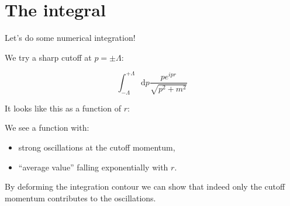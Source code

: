 \documentclass[aspectratio=169]{beamer}
\newcommand{\integrand}{\frac{p e^{ipr}}{\sqrt{p^2 + m^2}}}
\newcommand{\diffop}{\mathop{}\!\mathrm{d}}
\newcommand{\dip}{\diffop p}
\begin{document}

\section{The integral}

\begin{frame}
Let's do some numerical integration!
\end{frame}


\begin{frame}
We try a sharp \alert{cutoff} at $p = \pm \Lambda$:

$$\int_{-\Lambda}^{+\Lambda} \dip \integrand$$

\bigskip
It looks like this \alert{as a function of $r$}:
\end{frame}






\begin{frame}
We see a function with:

\begin{itemize}
\pause
\item strong \alert{oscillations} at the cutoff momentum,

\pause
\item \alert{``average value''} falling \alert{exponentially} with $r$.
\end{itemize}

\pause
\bigskip
By deforming the integration contour we can show that indeed \alert{only}
the cutoff momentum contributes to the oscillations.
\end{frame}
\end{document}
